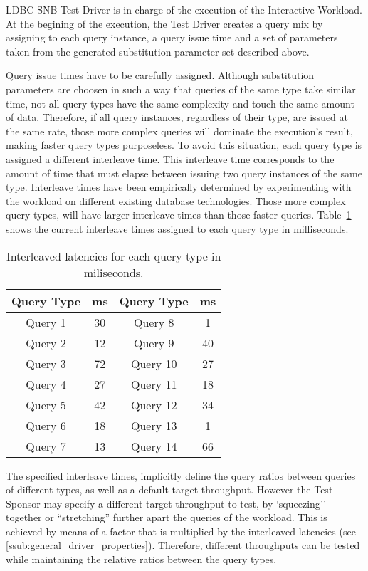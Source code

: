 

LDBC-SNB Test Driver is in charge of the execution of the Interactive Workload.
At the begining of the execution, the Test Driver creates a query mix by
assigning to each query instance, a query issue time and a set of parameters
taken from the generated substitution parameter set described above.  

Query issue times have to be carefully assigned.  Although substitution
parameters are choosen in such a way that queries of the same type take similar
time, not all query types have the same complexity and touch the same amount of
data. Therefore, if all query instances, regardless of their type, are issued
at the same rate, those more complex queries will dominate the execution's
result, making faster query types purposeless. To avoid this situation, each
query type is assigned a different interleave time. This interleave time
corresponds to the amount of time that must elapse between issuing two query
instances of the same type. Interleave times have been empirically determined
by experimenting with the workload on different existing database technologies.
Those more complex query types, will have larger interleave times than those
faster queries. Table~\ref{table:interleaved} shows the current interleave times 
assigned to each query type in milliseconds.

\begin{table}[H]
\centering
    \begin{tabular}{|c|c|c|c|}
    \hline
    Query Type & ms & Query Type & ms \\ 
    \hline
    \hline
    Query 1 & 30 & Query 8 & 1 \\ 
    \hline       
    Query 2 & 12 & Query 9 & 40 \\  
    \hline        
    Query 3 & 72 & Query 10 & 27 \\ 
    \hline        
    Query 4 & 27 & Query 11 & 18 \\ 
    \hline        
    Query 5 & 42 & Query 12 & 34 \\ 
    \hline        
    Query 6 & 18 & Query 13 & 1 \\  
    \hline        
    Query 7 & 13 & Query 14 & 66 \\ 
    \hline
    \end{tabular}
    \caption{Interleaved latencies for each query type in miliseconds.}
    \label{table:interleaved}
\end{table}

The specified interleave times, implicitly define the query ratios between
queries of different types, as well as a default target throughput. However the
Test Sponsor may specify a different target throughput to test,  by
`squeezing'' together or ``stretching'' further apart the queries of the
workload. This is achieved  by means of a factor that is multiplied by the
interleaved latencies (see \ref{ssub:general_driver_properties}).  Therefore,
different throughputs can be tested while maintaining the relative ratios
between the query types.


